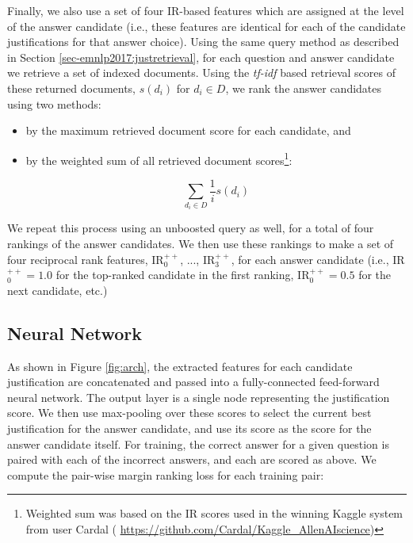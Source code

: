 {} 
Finally, we also use a set of four IR-based features which are assigned at the level of the answer candidate (i.e., these features are identical for each of the candidate justifications for that answer choice).   
Using the same query method as described in Section \ref{sec-emnlp2017:justretrieval}, for each question and answer candidate we retrieve a set of indexed documents.
Using the \emph{tf-idf} based retrieval scores of these returned documents, 
$s(d_i)$ for $d_i \in D$, we rank the answer candidates using two methods: 
\begin{itemize}
\item by the maximum retrieved document score for each candidate, and  
\item by the weighted sum of all retrieved document scores\footnote{Weighted sum was based on the IR scores used in the winning Kaggle system from user Cardal (\scriptsize{ \url{https://github.com/Cardal/Kaggle_AllenAIscience}})}:

\begin{equation}
\sum_{d_i \in D} \dfrac{1}{i} s(d_i) 
\end{equation}

\end{itemize}
We repeat this process using an unboosted query as well, for a total of four rankings of the answer candidates.  
We then use these rankings to make a set of four reciprocal rank features,  IR$^{++}_0$, ..., IR$^{++}_3$, for each answer candidate (i.e., IR$^{++}_0 = 1.0$ for the top-ranked candidate in the first ranking,  IR$^{++}_0 = 0.5$ for the next candidate, etc.)
  


\subsection{Neural Network}
\label{sec-emnlp2017:nn_model}

As shown in Figure \ref{fig:arch}, the extracted features for each candidate justification are concatenated and passed into a fully-connected feed-forward neural network.  The output layer is a single node representing the justification score.  We then use max-pooling over these scores to select the current best justification for the answer candidate, and use its score as the score for the answer candidate itself.  For training, the correct answer for a given question is paired with each of the incorrect answers, and each are scored as above.  We compute the pair-wise margin ranking loss for each training pair:


